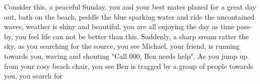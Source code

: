 Consider this, a peaceful Sunday, you and your best mates planed for a great day out, bath on the beach, peddle the blue sparking water and ride the uncontained waves, weather is shiny and beautiful, you are all enjoying the day as time pass-by, you feel life can not be better than this. Suddenly, a sharp sream ratter the sky, as you searching for the source, you see Michael, your friend, is running towards you, waving and shouting "Call 000, Ben needs help". As you jump up from your cosy beach chair, you see Ben is tragged by a group of people towards you, you search for 